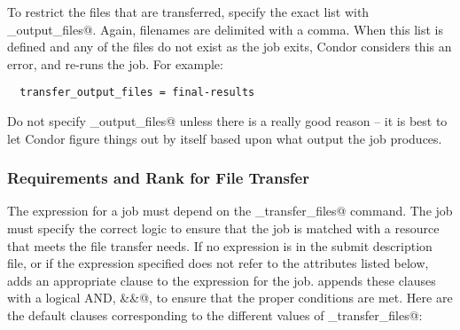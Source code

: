To restrict the files that are transferred,
specify the exact list with \verb@transfer_output_files@.
Again, filenames are delimited with a comma.
When this list is defined and any of the files do not exist as the
job exits, Condor considers this an error, and re-runs the job.
For example:

\begin{verbatim}
  transfer_output_files = final-results
\end{verbatim}

\Warn Do not specify \verb@transfer_output_files@ unless there is a
really good reason -- it is best to let Condor figure things out by
itself based upon what output the job produces.


\subsubsection{Requirements and Rank for File Transfer}

The  expression for a job must depend
on the \verb@should_transfer_files@ command.
The job must specify the correct logic to ensure that the job is matched
with a resource that meets the file transfer needs.
If no  expression is in the submit description file,
or if the expression specified does not refer to the
attributes listed below,  adds an
appropriate clause to the  expression for the job.
 appends these clauses with a logical AND, \verb@&&@,
to ensure that the proper conditions are met.
Here are the default clauses corresponding to the different values of
\verb@should_transfer_files@:

